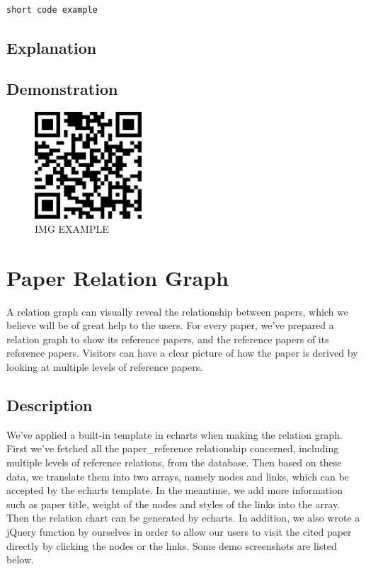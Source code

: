\documentclass{book}
\begin{document}
\begin{minipage}[r]{15em}
\begin{verbatim}

short code example

\end{verbatim}
\end{minipage}

\subsection{Explanation}

\subsection{Demonstration}

\begin{figure}[H]
\centering
\includegraphics[height=4.0cm,width=4.0cm]{img/fsh_1.jpg}
\caption{IMG EXAMPLE}
\end{figure}



\section {Paper Relation Graph}

A relation graph can visually reveal the relationship between papers, which we believe will be of great help to the users. For every paper, we've prepared a relation graph to show its reference papers, and the reference papers of its reference papers. Visitors can have a clear picture of how the paper is derived by looking at multiple levels of reference papers.

\subsection{Description}

We've applied a built-in template in echarts when making the relation graph. First we've fetched all the paper\_reference relationship concerned, including multiple levels of reference relations, from the database. Then based on these data, we translate them into two arrays, namely nodes and links, which can be accepted by the echarts template. In the meantime, we add more information such as paper title, weight of the nodes and styles of the links into the array. Then the relation chart can be generated by echarts. In addition, we also wrote a jQuery function by ourselves in order to allow our users to visit the cited paper directly by clicking the nodes or the links. Some demo screenshots are listed below.
\end{document}
